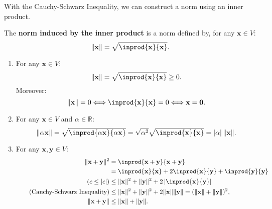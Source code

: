 \documentclass{huhtakm-template-book-v2}
\begin{document}
    With the Cauchy-Schwarz Inequality, we can construct a norm using an inner product.
    \begin{thm}
        The \textbf{norm induced by the inner product} is a norm defined by, for any $\mathbf{x} \in V$:
        \begin{equation*}
            \norm{\mathbf{x}} = \sqrt{\inprod{\mathbf{x}}{\mathbf{x}}}.
        \end{equation*}
    \end{thm}
    \begin{proofing}
        \begin{enumerate}
            \item For any $\mathbf{x} \in V$:
            \begin{equation*}
                \norm{\mathbf{x}} = \sqrt{\inprod{\mathbf{x}}{\mathbf{x}}} \geq 0.
            \end{equation*}
            Moreover:
            \begin{equation*}
                \norm{\mathbf{x}} = 0 \Longleftrightarrow \inprod{\mathbf{x}}{\mathbf{x}} = 0 \Longleftrightarrow \mathbf{x} = \mathbf{0}.
            \end{equation*}
            \item For any $\mathbf{x} \in V$ and $\alpha \in \mathbb{R}$:
            \begin{equation*}
                \norm{\alpha\mathbf{x}} = \sqrt{\inprod{\alpha\mathbf{x}}{\alpha\mathbf{x}}} = \sqrt{\alpha^{2}}\sqrt{\inprod{\mathbf{x}}{\mathbf{x}}} = \abs{\alpha}\norm{\mathbf{x}}.
            \end{equation*}
            \item For any $\mathbf{x}, \mathbf{y} \in V$:
            \begin{align*}
                \norm{\mathbf{x} + \mathbf{y}}^{2} &= \inprod{\mathbf{x} + \mathbf{y}}{\mathbf{x} + \mathbf{y}}\\
                &= \inprod{\mathbf{x}}{\mathbf{x}} + 2\inprod{\mathbf{x}}{\mathbf{y}} + \inprod{\mathbf{y}}{\mathbf{y}}\\
                \tag{$c \leq \abs{c}$}
                &\leq \norm{\mathbf{x}}^{2} + \norm{\mathbf{y}}^{2} + 2\abs{\inprod{\mathbf{x}}{\mathbf{y}}}\\
                \tag{Cauchy-Schwarz Inequality}
                &\leq \norm{\mathbf{x}}^{2} + \norm{\mathbf{y}}^{2} + 2\norm{\mathbf{x}}\norm{\mathbf{y}} = (\norm{\mathbf{x}} + \norm{\mathbf{y}})^{2},\\
                \norm{\mathbf{x} + \mathbf{y}} &\leq \norm{\mathbf{x}} + \norm{\mathbf{y}}.
            \end{align*}
        \end{enumerate}
    \end{proofing}
\end{document}
